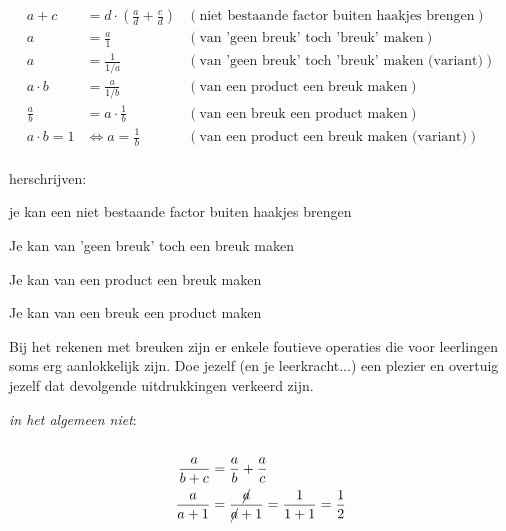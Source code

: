 \documentclass{ximera}
\begin{document}
\begin{proposition}\label{eig:rekenregels_breuken2}
    \[
        \begin{array}{rll}
        a + c &= d\cdot (\frac ad +\frac cd)
        & (\text{niet bestaande factor buiten haakjes brengen})\\
        a  &= \frac a1
        & (\text{van 'geen breuk' toch 'breuk' maken})\\
        a  &= \frac {1}{1/a}
        & (\text{van 'geen breuk' toch 'breuk' maken (variant)})\\
        a\cdot b  &= \frac {a}{1/b}
        & (\text{van een product een breuk maken})\\
        \frac ab  &= a\cdot \frac 1b
        & (\text{van een breuk een product maken})\\
        a\cdot b = 1  &\iff a = \frac 1b
        & (\text{van een product een breuk maken (variant)})\\
        \end{array}
    \]
\end{proposition}

herschrijven: 

je kan een niet bestaande factor buiten haakjes brengen 


Je kan van 'geen breuk' toch een breuk maken 

Je kan van een product een breuk maken 


Je kan van een breuk een product maken 







Bij het rekenen met breuken zijn er enkele foutieve operaties die voor leerlingen soms erg aanlokkelijk zijn. 
Doe jezelf (en je leerkracht...) een plezier en overtuig jezelf dat devolgende uitdrukkingen verkeerd zijn. 


\begin{remark}\nl \label{eig:niet-rekenregels_breuken}
     
    \textit{in het algemeen niet}:
    \\
    \\
    \[
    \begin{aligned}
        \frac{a}{b+c} &=    \frac{a}{b} + \frac{a}{c}\\
        \frac{a}{a+1} &=    \frac{\cancel{a}}{\cancel{a}+1}  = \frac{1}{1+1} = \frac{1}{2}\\
    \end{aligned}
    \]

\end{remark}
\end{document}
